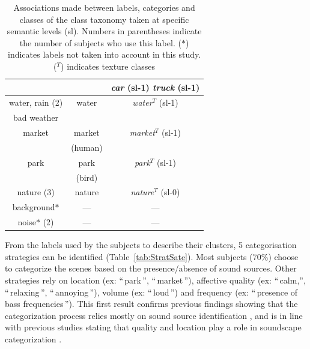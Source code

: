 \documentclass[twoside,twocolumn]{article}
\begin{document}
\begin{table}[t]
{\begin{tabular}{ccc}
                      &                  &  \textit{car} (sl-1) \textit{truck} (sl-1) \\ 
\hline
water, rain (2)       & water            &   \textit{water}$^T$ (sl-1)          \\ 
bad weather           &                  &                                  \\ 
\hline
market                & market           &   \textit{market}$^T$ (sl-1)          \\ 
                      & (human)          &                                    \\
park                  & park             &   \textit{park}$^T$ (sl-1)           \\ 
                      & (bird)           &                                    \\
nature (3)            & nature           &   \textit{nature}$^T$ (sl-0)          \\  
background$*$         & ---              &    ---                              \\ 
noise$*$ (2)          & ---              &    ---                              \\               
\hline
\end{tabular}
}
\vspace{0.5mm}
\caption{\label{tab:association}  Associations made between labels, categories and classes of the class taxonomy taken at specific semantic levels (sl). Numbers in parentheses indicate the number of subjects who use this label. ($*$) indicates labels not taken into account in this study. ($^T$) indicates texture classes}
\end{table}

From the labels used by the subjects to describe their clusters, 5 categorisation strategies can be identified (Table~\ref{tab:StratSate}). Most subjects ($70\%$) choose to categorize the scenes based on the presence/absence of sound sources. Other strategies rely on location (ex: ``\,park\,'', ``\,market\,''), affective quality (ex: ``\,calm,'', ``\,relaxing\,'', ``\,annoying\,''), volume (ex: ``\,loud\,'') and frequency (ex: ``\,presence of bass frequencies\,'').  This first result confirms previous findings showing that the categorization process relies mostly on sound source identification \cite{dubois2006cognitive,maffiolo_caracterisation_1999}, and is in line with previous studies stating that quality and location play a role in soundscape categorization \cite{aletta2016soundscape}.
\end{document}
